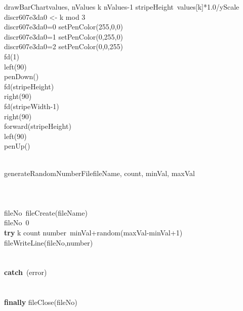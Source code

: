 \documentclass[a4paper,10pt]{article}
\begin{document}
\begin{pseudocode}{drawBarChart}{values, nValues }
  \FOR k  \TO nValues-1  \DO
  \BEGIN
    stripeHeight\gets\ values[k]*1.0/yScale\\
    discr607e3da0 <- k mod 3\\
    \IF discr607e3da0=0 \THEN
      setPenColor(255,0,0)\\
    \ELSEIF discr607e3da0=1 \THEN
      setPenColor(0,255,0)\\
    \ELSEIF discr607e3da0=2 \THEN
      setPenColor(0,0,255)\\
    fd(1)\\
    left(90)\\
    penDown()\\
    fd(stripeHeight)\\
    right(90)\\
    fd(stripeWidth-1)\\
    right(90)\\
    forward(stripeHeight)\\
    left(90)\\
    penUp()\\
  \END\\
\ENDPROCEDURE
\end{pseudocode}


\begin{pseudocode}{generateRandomNumberFile}{fileName, count, minVal, maxVal }
\label{generateRandomNumberFile}
\\
\\
\\
\\
  fileNo\gets\ fileCreate(fileName)\\
  \IF fileNo\leq\ 0 \THEN
    \\
  \textbf{try} \BEGIN
    \FOR k  \TO count  \DO
    \BEGIN
      number\gets\ minVal+random(maxVal-minVal+1)\\
      fileWriteLine(fileNo,number)\\
    \END\\
  \END\\
  \textbf{catch}\ (error)\BEGIN
    \\
    \\
  \END\\
  \textbf{finally} \BEGIN
    fileClose(fileNo)\\
  \END\\
  \\
\ENDPROCEDURE
\end{pseudocode}
\end{document}
